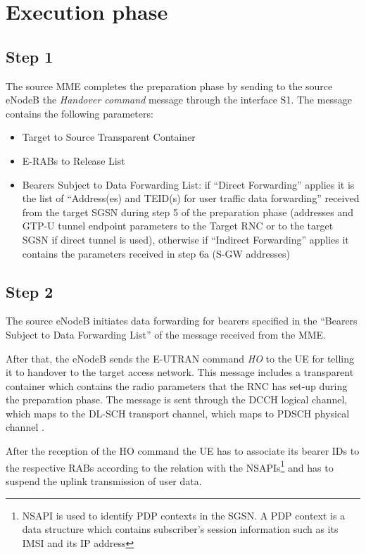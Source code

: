 \section{Execution phase}



\subsection*{Step 1}
The source MME completes the preparation phase by sending to the source eNodeB
the \emph{Handover command} message through the interface S1. The message
contains the following parameters:
\begin{itemize}
    \item Target to Source Transparent Container
    \item E-RABs to Release List
    \item Bearers Subject to Data Forwarding List: if ``Direct
    Forwarding'' applies it is the list of ``Address(es) and TEID(s) for user
    traffic data forwarding'' received from the target SGSN during step 5
    of the preparation phase (addresses and GTP-U tunnel endpoint parameters to
    the Target RNC or to the target SGSN if direct tunnel is used), otherwise
    if ``Indirect Forwarding'' applies it contains the parameters received in
    step 6a (S-GW addresses)
\end{itemize}



\subsection*{Step 2}
The source eNodeB initiates data forwarding for bearers specified in the
``Bearers Subject to Data Forwarding List'' of the message received from the MME.

After that, the eNodeB sends the E-UTRAN command \emph{HO} to the UE for telling
it to handover to the target access network. This message includes a transparent
container which contains the radio parameters that the RNC has set-up during the
preparation phase. The message is sent through the DCCH logical channel, which
maps to the DL-SCH transport channel, which maps to PDSCH physical channel \cite{channels}.

After the reception of the HO command the UE has to associate its bearer IDs to
the respective RABs according to the relation with the NSAPIs\footnote{NSAPI is
used to identify PDP contexts in the SGSN. A PDP context is a data structure
which contains subscriber's session information such as its IMSI and its IP
address} and has to suspend the uplink transmission of user data.



